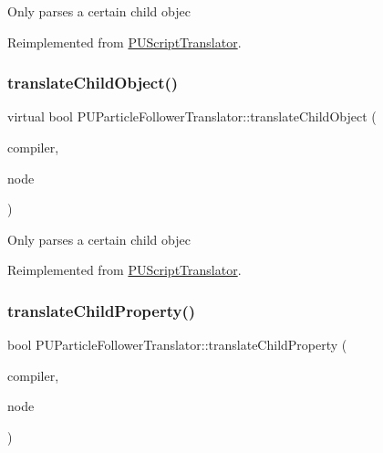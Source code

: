 Only parses a certain child objec 

Reimplemented from \hyperlink{classPUScriptTranslator_ab587d01348ae3e678cb700c719b2b113}{P\+U\+Script\+Translator}.

\mbox{\label{classPUParticleFollowerTranslator_a962f3cdf389ba6b23e10204a6efd04a8}} 
\subsubsection{\texorpdfstring{translate\+Child\+Object()}{translateChildObject()}\hspace{0.1cm}{\footnotesize\ttfamily [2/2]}}
{\footnotesize\ttfamily virtual bool P\+U\+Particle\+Follower\+Translator\+::translate\+Child\+Object (\begin{DoxyParamCaption}\item[{\hyperlink{classPUScriptCompiler}{P\+U\+Script\+Compiler} $\ast$}]{compiler,  }\item[{\hyperlink{classPUAbstractNode}{P\+U\+Abstract\+Node} $\ast$}]{node }\end{DoxyParamCaption})\hspace{0.3cm}{\ttfamily [virtual]}}

Only parses a certain child objec 

Reimplemented from \hyperlink{classPUScriptTranslator_ab587d01348ae3e678cb700c719b2b113}{P\+U\+Script\+Translator}.

\mbox{\label{classPUParticleFollowerTranslator_a3e490698cdbd4523b9da61af9253337a}} 
\subsubsection{\texorpdfstring{translate\+Child\+Property()}{translateChildProperty()}\hspace{0.1cm}{\footnotesize\ttfamily [1/2]}}
{\footnotesize\ttfamily bool P\+U\+Particle\+Follower\+Translator\+::translate\+Child\+Property (\begin{DoxyParamCaption}\item[{\hyperlink{classPUScriptCompiler}{P\+U\+Script\+Compiler} $\ast$}]{compiler,  }\item[{\hyperlink{classPUAbstractNode}{P\+U\+Abstract\+Node} $\ast$}]{node }\end{DoxyParamCaption})\hspace{0.3cm}{\ttfamily [virtual]}}

